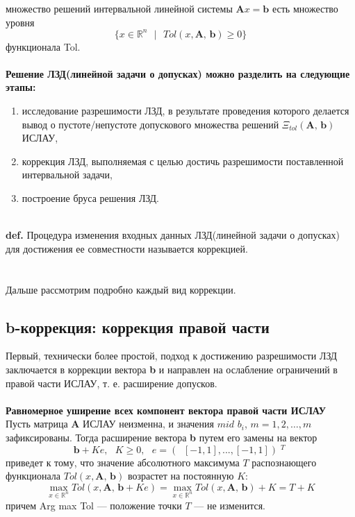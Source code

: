 \documentclass[10pt]{article}
\begin{document}
множество решений интервальной линейной системы $\textbf{A}x=\textbf{b}$ есть множество уровня
\begin{equation*}
 \{x \in \mathbb{R}^n \textbf{ }|\textbf{ } Tol(x,\textbf{A, b}) \geq 0\}
 \end{equation*}
функционала Tol.
\\
\\
\textbf{Решение ЛЗД(линейной задачи о допусках) можно разделить на следующие этапы:}
\begin{enumerate}
    \item исследование разрешимости ЛЗД, в результате проведения которого делается вывод о пустоте/непустоте допускового множества решений $\Xi_{tol}(\textbf{A, b})$ ИСЛАУ,
    \item  коррекция ЛЗД, выполняемая с целью достичь разрешимости поставленной интервальной задачи,
    \item построение бруса решения ЛЗД.
\end{enumerate}
\\
\textbf{def.} Процедура изменения входных данных ЛЗД(линейной задачи о допусках) для достижения ее совместности называется коррекцией.\\
\\
\\Дальше рассмотрим подробно каждый вид коррекции.
\subsection{b-коррекция: коррекция правой части}
Первый, технически более простой, подход к достижению разрешимости ЛЗД заключается в коррекции вектора \textbf{b} и направлен на ослабление ограничений в правой части ИСЛАУ, т. е. расширение допусков.\\
\\
\textbf{Равномерное уширение всех компонент вектора правой части
ИСЛАУ}\\
Пусть матрица \textbf{A} ИСЛАУ неизменна, и значения $mid$ $b_i$, $m=1,2,\dots,m$ зафиксированы. Тогда расширение вектора \textbf{b} путем его замены на вектор
\begin{equation*}
\textbf{b} + Ke, \textbf{ }K ≥ 0,\textbf{ }e =(︀[−1, 1], . . . , [−1, 1])︀^T
 \end{equation*}
приведет к тому, что значение абсолютного максимума $T$ распознающего функционала $Tol(x,\textbf{A, b})$ возрастет на постоянную $K$:
\begin{equation*}
\max_{x \in \mathbb{R}^n}Tol(x, \textbf{A, b}+Ke)=\max_{x \in \mathbb{R}^n}Tol(x, \textbf{A, b})+K=T+K
\end{equation*}
причем Arg max Tol — положение точки $T$ — не изменится.
\\
\end{document}
